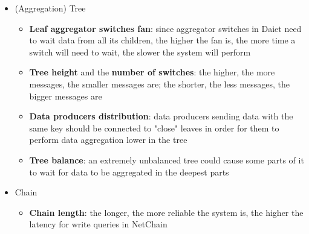 \begin{itemize}
    \item (Aggregation) Tree
    \begin{itemize}
        \item \textbf{Leaf aggregator switches fan}: since aggregator switches in Daiet \cite{daiet} need to wait data from all its children, the higher the fan is, the more time a switch will need to wait, the slower the system will perform
        \item \textbf{Tree height} and the \textbf{number of switches}: the higher, the more messages, the smaller messages are; the shorter, the less messages, the bigger messages are
        \item \textbf{Data producers distribution}: data producers sending data with the same key should be connected to "close" leaves in order for them to perform data aggregation lower in the tree
        \item \textbf{Tree balance}: an extremely unbalanced tree could cause some parts of it to wait for data to be aggregated in the deepest parts
    \end{itemize}
    \item Chain
    \begin{itemize}
        \item \textbf{Chain length}: the longer, the more reliable the system is, the higher the latency for write queries in NetChain \cite{netchain}
    \end{itemize}
\end{itemize}